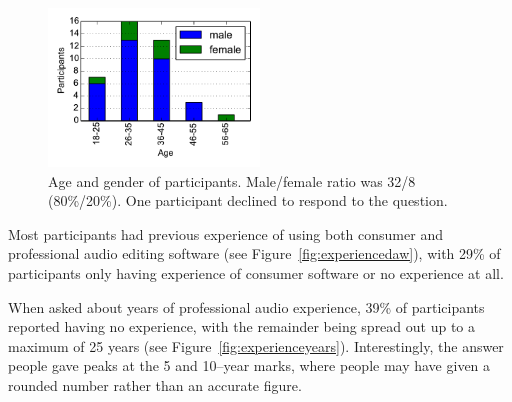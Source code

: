 \begin{figure}[ht]
  \centering
  \includegraphics[width=0.5\textwidth]{figs/age.pdf}
  \caption{Age and gender of participants. Male/female ratio was 32/8
    (80\%/20\%). One participant declined to respond to the question.}
  \label{fig:age}
\end{figure}

Most participants had previous experience of using both consumer and professional audio editing software (see
Figure~\ref{fig:experiencedaw}), with 29\% of participants only having experience of consumer software or no experience
at all.

When asked about years of professional audio experience, 39\% of participants reported having no experience, with the
remainder being spread out up to a maximum of 25 years (see Figure~\ref{fig:experienceyears}). Interestingly, the
answer people gave peaks at the 5 and 10--year marks, where people may have given a rounded number rather than an
accurate figure.

